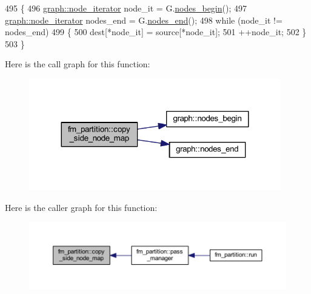 \begin{DoxyCode}
495 \{
496     \mbox{\hyperlink{classgraph_a2cb374b84c133ce13f94e73c3e5da7fa}{graph::node\_iterator}} node\_it = G.\mbox{\hyperlink{classgraph_aec053a4b509d1be804237a80044c54c0}{nodes\_begin}}();
497     \mbox{\hyperlink{classgraph_a2cb374b84c133ce13f94e73c3e5da7fa}{graph::node\_iterator}} nodes\_end = G.\mbox{\hyperlink{classgraph_abbf9c0cb5629e98e1142254911238173}{nodes\_end}}();
498     \textcolor{keywordflow}{while} (node\_it != nodes\_end)
499     \{
500     dest[*node\_it] = source[*node\_it];
501     ++node\_it;
502     \}
503 \}
\end{DoxyCode}
Here is the call graph for this function\+:\nopagebreak
\begin{figure}[H]
\begin{center}
\leavevmode
\includegraphics[width=311pt]{classfm__partition_a33d1dbba0ce9e398adab753f403deac3_cgraph}
\end{center}
\end{figure}
Here is the caller graph for this function\+:\nopagebreak
\begin{figure}[H]
\begin{center}
\leavevmode
\includegraphics[width=350pt]{classfm__partition_a33d1dbba0ce9e398adab753f403deac3_icgraph}
\end{center}
\end{figure}
\mbox{\label{classfm__partition_a25ef3fc22bee176abfef64248484e8c0}} 
